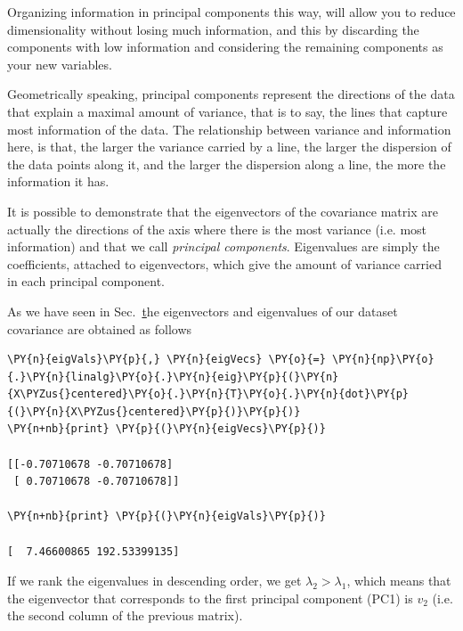 Organizing information in principal components this way, will allow you to reduce dimensionality without losing much information, and this by discarding the components with low information and considering the remaining components as your new variables.

Geometrically speaking, principal components represent the directions of the data that explain a maximal amount of variance, that is to say, the lines that capture most information of the data. The relationship between variance and information here, is that, the larger the variance carried by a line, the larger the dispersion of the data points along it, and the larger the dispersion along a line, the more the information it has.

It is possible to demonstrate that the eigenvectors of the covariance matrix are actually the directions of the axis where there is the most variance (i.e. most information) and that we call \emph{principal components}. Eigenvalues are simply the coefficients, attached to eigenvectors, which give the amount of variance carried in each principal component.

As we have seen in Sec.~\href{find-eigenvalues-and-eigenvectors-in-python} the eigenvectors and eigenvalues of our dataset covariance are obtained as follows

\begin{tcolorbox}[breakable, size=fbox, boxrule=1pt, pad at break*=1mm,colback=cellbackground, colframe=cellborder]
\begin{Verbatim}[commandchars=\\\{\}]
\PY{n}{eigVals}\PY{p}{,} \PY{n}{eigVecs} \PY{o}{=} \PY{n}{np}\PY{o}{.}\PY{n}{linalg}\PY{o}{.}\PY{n}{eig}\PY{p}{(}\PY{n}{X\PYZus{}centered}\PY{o}{.}\PY{n}{T}\PY{o}{.}\PY{n}{dot}\PY{p}{(}\PY{n}{X\PYZus{}centered}\PY{p}{)}\PY{p}{)}
\PY{n+nb}{print} \PY{p}{(}\PY{n}{eigVecs}\PY{p}{)}
	
[[-0.70710678 -0.70710678]
 [ 0.70710678 -0.70710678]]

\PY{n+nb}{print} \PY{p}{(}\PY{n}{eigVals}\PY{p}{)}

[  7.46600865 192.53399135]
\end{Verbatim}
\end{tcolorbox}

If we rank the eigenvalues in descending order, we get $\lambda_2\gt\lambda_1$, which means that the eigenvector that corresponds to the first principal component (PC1) is  $v_2$ (i.e. the second column of the previous matrix).

